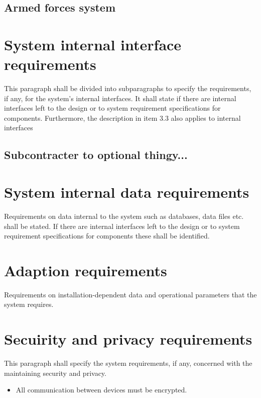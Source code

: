 \subsection{Armed forces system}

\section{System internal interface requirements}
This paragraph shall be divided into subparagraphs to specify the requirements, if any, for the system’s internal interfaces. It shall state if there are internal interfaces left to the design or to system requirement specifications for components. Furthermore, the description in item 3.3 also applies to internal interfaces

\subsection{Subcontracter to optional thingy...}

\section{System internal data requirements}
Requirements on data internal to the system such as databases, data files etc. shall be stated. If there are internal interfaces left to the design or to system requirement specifications for components these shall be identified.

\section{Adaption requirements}
Requirements on installation-dependent data and operational parameters that the system requires.


\section{Secuirity and privacy requirements}
This paragraph shall specify the system requirements, if any, concerned with the maintaining security and privacy.

\begin{itemize}
	\item All communication between devices must be encrypted.
\end{itemize}

